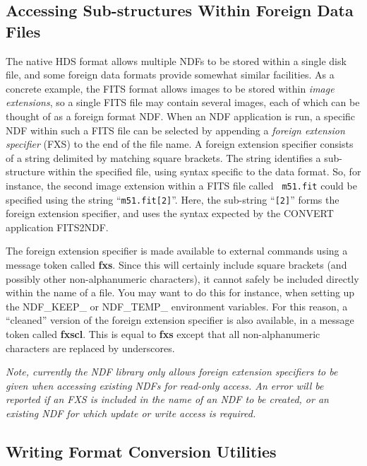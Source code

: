 \subsection{\label{sect:fxs}Accessing Sub-structures Within Foreign Data Files}
The native HDS format allows multiple NDFs to be stored within a single disk
file, and some foreign data formats provide somewhat similar facilities.
As a concrete example, the FITS format allows images to be stored within
{\em image extensions}, so a single FITS file may contain several images,
each of which can be thought of as a foreign format NDF. When an
NDF application is run, a specific NDF within such a FITS file can be
selected by appending a {\em foreign extension specifier} (FXS) to the
end of the file name. A foreign extension specifier consists of a string
delimited by matching square brackets. The string identifies a sub-structure
within the specified file, using syntax specific to the data format. So,
for instance, the second image extension within a FITS file called {\tt
m51.fit} could be specified using the string ``{\tt m51.fit[2]}''. Here, the
sub-string ``{\tt [2]}'' forms the foreign extension specifier, and uses the
syntax expected by the CONVERT application FITS2NDF.

The foreign extension specifier is made available to external commands
using a message token called {\bf fxs}. Since this will certainly include
square brackets (and possibly other non-alphanumeric characters), it
cannot safely be included directly within the name of a file. You may
want to do this for instance, when setting up the NDF\_KEEP\_  or
NDF\_TEMP\_ environment variables. For this reason, a ``cleaned'' version
of the foreign extension specifier is also available, in a message token
called {\bf fxscl}. This is equal to {\bf fxs} except that all
non-alphanumeric characters are replaced by underscores.

\begin{center}
{\em Note, currently the NDF library only allows foreign extension specifiers
to be given when accessing existing NDFs for read-only access. An error
will be reported if an FXS is included in the name of an NDF to be
created, or an existing NDF for which update or write access is required.}
\end{center}

\subsection{\label{sect:conversionutilities}Writing Format Conversion Utilities}

